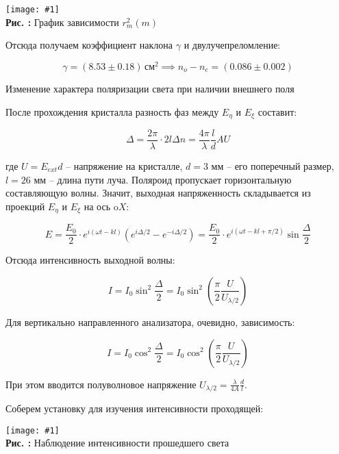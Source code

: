 \documentclass{beamer}
\newcounter{picture}
\newcommand{\embed}[3]{\begin{center}
		\texttt{[image: \#1]}
		\\\textbf{Рис. \thepicture:} #3
		\label{pic_\thepicture}
		\addtocounter{picture}{1}
\end{center}}
\newcommand{\embedeps}[3]{\begin{center}
		\texttt{[image: \#1]}
		\\\textbf{Рис. \thepicture:} #3
		\label{pic_\thepicture}
		\addtocounter{picture}{1}
\end{center}}
\begin{document}
	\begin{frame}
		\embedeps{PIC_5.eps}{0.75}{График зависимости $r_m^2(m)$}
		
		Отсюда получаем коэффициент наклона $\gamma$ и двулучепреломление:
		
		$$ \gamma = (8.53 \pm 0.18)\, \text{см}^2 \implies n_o - n_e = (0.086 \pm 0.002)$$
	\end{frame}

	\begin{frame}
		{\large Изменение характера поляризации света при наличии внешнего поля}
		
		После прохождения кристалла разность фаз между $E_\eta$ и $E_\xi$ составит:
		
		$$ \Delta = \frac{2\pi}{\lambda} \cdot2l\Delta n = \frac{4\pi}{\lambda} \frac{l}{d} AU $$
		
		 где $U = E_{ext}d$ -- напряжение на кристалле, $d = 3$ мм -- его поперечный размер, $l = 26$ мм -- длина пути луча. Поляроид пропускает горизонтальную составляющую волны. Значит, выходная напряженность складывается из проекций $E_\eta$ и $E_\xi$ на ось $\mathrm{o}X$:
		 
		 $$ E = \frac{E_0}{2} \cdot e^{i(\omega t - kl)} (e^{i\Delta/2} - e^{-i\Delta/2}) = \frac{E_0}{2} \cdot  e^{i(\omega t - kl + \pi/2)} \sin\frac{\Delta}{2} $$
	\end{frame}

	\begin{frame}
		Отсюда интенсивность выходной волны: 
		
		$$ I = I_0 \sin^2\frac{\Delta}{2} = I_0\sin^2 \left(\frac{\pi}{2}\frac{U}{U_{\lambda/2}}\right) $$
		
		Для вертикально направленного анализатора, очевидно, зависимость:
		
		$$ I = I_0 \cos^2\frac{\Delta}{2} = I_0\cos^2 \left(\frac{\pi}{2}\frac{U}{U_{\lambda/2}}\right) $$
		
		При этом вводится полуволновое напряжение $U_{\lambda/2} = \frac{\lambda}{4A}\frac{d}{l}$.
	\end{frame}

	\begin{frame}
		Соберем установку для изучения интенсивности проходящей:
		
		\embed{PPIC_2.png}{0.055}{Наблюдение интенсивности прошедшего света}
	\end{frame}
\end{document}
